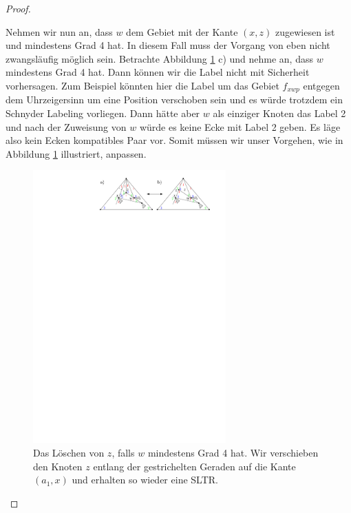 \begin{proof}
\begin{description}[leftmargin =0pt, font = \bfseries]
Nehmen wir nun an, dass $w$ dem Gebiet mit der Kante $(x,z)$ zugewiesen ist und mindestens Grad 4 hat. In diesem Fall muss der Vorgang von eben nicht zwangsläufig möglich sein. Betrachte Abbildung \ref{pic_lem5_6} c) und nehme an, dass $w$ mindestens Grad 4 hat. Dann können wir die Label nicht mit Sicherheit vorhersagen. Zum Beispiel könnten hier die Label um das Gebiet $f_{xwp}$ entgegen dem Uhrzeigersinn um eine Position verschoben sein und es würde trotzdem ein Schnyder Labeling vorliegen. Dann hätte aber $w$ als einziger Knoten das Label 2 und nach der Zuweisung von $w$ würde es keine Ecke mit Label 2 geben. Es läge also kein Ecken kompatibles Paar vor. Somit müssen wir unser Vorgehen, wie in Abbildung \ref{pic_lem5_6} illustriert, anpassen.

\begin{figure}[h]
	\centering
	  \includegraphics[width=0.66\textwidth]{lem5_6.pdf}
    	\caption{Das Löschen von $z$, falls $w$ mindestens Grad 4 hat. Wir verschieben den Knoten $z$ entlang der gestrichelten Geraden auf die Kante $(a_1,x)$ und erhalten so wieder eine SLTR.}
    	\label{pic_lem5_6}
\end{figure}


\end{description}
\end{proof}
